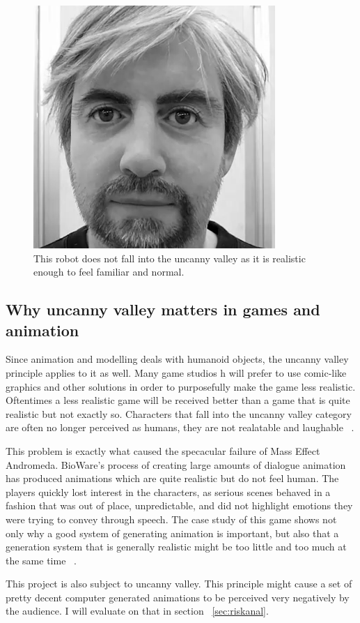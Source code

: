 \begin{figure}[H]
\centerline{\includegraphics[scale=0.45]{img/realrobot.png}}
\caption{This robot does not fall into the uncanny valley as it is realistic enough to feel familiar and normal.}\label{fig:realrobot}
\end{figure}

\subsection{Why uncanny valley matters in games and animation}

Since animation and modelling deals with humanoid objects, the uncanny valley principle applies to it as well. Many game studios h will prefer to use comic-like graphics and other solutions in order to purposefully make the game less realistic. Oftentimes a less realistic game will be received better than a game that is quite realistic but not exactly so. Characters that fall into the uncanny valley category are often no longer perceived as humans, they are not realatable and laughable ~\cite{uncannygames}.

This problem is exactly what caused the specacular failure of Mass Effect Andromeda. BioWare's  process of creating large amounts of dialogue animation has produced animations which are quite realistic but do not feel human. The players quickly lost interest in the characters, as serious scenes behaved in a fashion that was out of place, unpredictable, and did not highlight emotions they were trying to convey through speech. The case study of this game shows not only why a good system of generating animation is important, but also that a generation system that is generally realistic might be too little and too much at the same time ~\cite{uncannyandromeda}.

This project is also subject to uncanny valley. This principle might cause a set of pretty decent computer generated animations to be perceived very negatively by the audience. I will evaluate on that in section ~\ref{sec:riskanal}.






